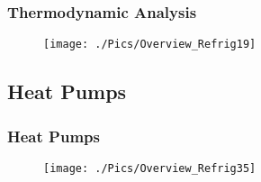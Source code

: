 \documentclass[10pt,compress,handout,unknownkeysallowed]{beamer}
\begin{document}
\begin{frame}
\begin{columns}
\end{columns}
\end{frame}
 

\begin{frame}
 \frametitle{Thermodynamic Analysis} 
   \begin{figure}%
     \texttt{[image: ./Pics/Overview\_Refrig19]}
   \end{figure}
\end{frame}

\subsection{Heat Pumps}

\begin{frame}
 \frametitle{Heat Pumps}
    \begin{figure}%
     \begin{center}
      \texttt{[image: ./Pics/Overview\_Refrig35]}
     \end{center}
    \end{figure}
\end{frame}
\end{document}

